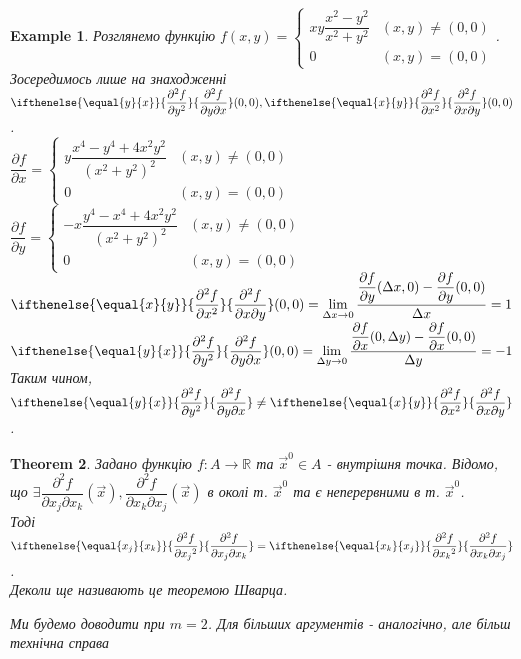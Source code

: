 \documentclass[a4paper, 10pt]{article}
\def\departial#1#2{\dfrac{\partial {#1}}{\partial {#2}}}
\def\seconddepartial#1#2#3{\ifthenelse{\equal{#2}{#3}}{\dfrac{\partial^2 {#1}}{\partial {#2}^2}}{\dfrac{\partial^2 {#1}}{\partial {#2} \partial {#3}}}}
\def\huge{\displaystyle}
\theoremstyle{theoremdd}
\newtheorem{theorem}{Theorem}[subsection]
\theoremstyle{theoremdd}
\theoremstyle{theoremdd}
\theoremstyle{theoremdd}
\theoremstyle{theoremdd}
\newtheorem{example}[theorem]{Example}
\theoremstyle{theoremdd}
\theoremstyle{theoremdd}
\theoremstyle{theoremdd}
\theoremstyle{theoremdd}
\begin{document}
\begin{example}
Розглянемо функцію $f(x,y) = \begin{cases} xy \dfrac{x^2-y^2}{x^2+y^2} & (x,y) \neq (0,0) \\ 0 & (x,y) = (0,0) \end{cases}$. Зосередимось лише на знаходженні $\seconddepartial{f}{y}{x}(0,0), \seconddepartial{f}{x}{y}(0,0)$.\\
$\departial{f}{x} = \begin{cases} y\dfrac{x^4-y^4+4x^2y^2}{(x^2+y^2)^2} & (x,y) \neq (0,0) \\ 0 & (x,y) = (0,0) \end{cases}$ \hspace{1cm} $\departial{f}{y} = \begin{cases} -x\dfrac{y^4-x^4+4x^2y^2}{(x^2+y^2)^2} & (x,y) \neq (0,0) \\ 0 & (x,y) = (0,0) \end{cases}$\\
$\seconddepartial{f}{x}{y}(0,0) = \huge\lim_{\Delta x \to 0} \dfrac{\departial{f}{y}(\Delta x, 0) - \departial{f}{y}(0,0)}{\Delta x} = 1$ \hspace{1cm} $\seconddepartial{f}{y}{x}(0,0) = \huge\lim_{\Delta y \to 0} \dfrac{\departial{f}{x}(0, \Delta y) - \departial{f}{x}(0,0)}{\Delta y} = -1$\\
Таким чином, $\seconddepartial{f}{y}{x} \neq \seconddepartial{f}{x}{y}$.
\end{example}

\begin{theorem}
Задано функцію $f: A \to \mathbb{R}$ та $\vec{x}^0 \in A$ - внутрішня точка. Відомо, що $\exists \dfrac{\partial^2 f}{\partial x_j \partial x_k} (\vec{x}), \dfrac{\partial^2 f}{\partial x_k \partial x_j} (\vec{x})$ в околі т. $\vec{x}^0$ та є неперервними в т. $\vec{x}^0$.\\
Тоді $\seconddepartial{f}{x_j}{x_k} = \seconddepartial{f}{x_k}{x_j}$.\\
\textit{Деколи ще називають це теоремою Шварца.}
\end{theorem}

\textit{Ми будемо доводити при $m = 2$. Для більших аргументів - аналогічно, але більш технічна справа}
\end{document}
